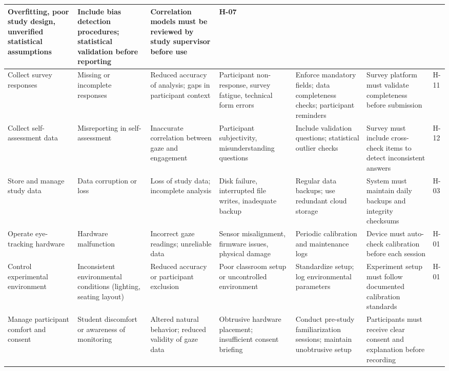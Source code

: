 \documentclass{article}
\begin{document}
\begin{table}[htbp]
{\begin{tabularx}{\textwidth}{|Y|Y|Y|Y|Y|Y|>{\centering\arraybackslash}p{1.2cm}|}
      Overfitting, poor study design, unverified statistical assumptions &
      Include bias detection procedures; statistical validation before reporting &
      Correlation models must be reviewed by study supervisor before use &
      H-07 \\
      \hline
      Collect survey responses & Missing or incomplete responses &
      Reduced accuracy of analysis; gaps in participant context &
      Participant non-response, survey fatigue, technical form errors &
      Enforce mandatory fields; data completeness checks; participant reminders &
      Survey platform must validate completeness before submission &
      H-11 \\
      \hline
      Collect self-assessment data & Misreporting in self-assessment &
      Inaccurate correlation between gaze and engagement &
      Participant subjectivity, misunderstanding questions &
      Include validation questions; statistical outlier checks &
      Survey must include cross-check items to detect inconsistent answers &
      H-12 \\
      \hline
      Store and manage study data & Data corruption or loss &
      Loss of study data; incomplete analysis &
      Disk failure, interrupted file writes, inadequate backup &
      Regular data backups; use redundant cloud storage &
      System must maintain daily backups and integrity checksums &
      H-03 \\
      \hline
      Operate eye-tracking hardware & Hardware malfunction & 
      Incorrect gaze readings; unreliable data &
      Sensor misalignment, firmware issues, physical damage &
      Periodic calibration and maintenance logs &
      Device must auto-check calibration before each session &
      H-01 \\
      \hline
      Control experimental environment & Inconsistent environmental conditions (lighting, seating layout) &
      Reduced accuracy or participant exclusion &
      Poor classroom setup or uncontrolled environment &
      Standardize setup; log environmental parameters &
      Experiment setup must follow documented calibration standards &
      H-01 \\
      \hline
      Manage participant comfort and consent & Student discomfort or awareness of monitoring &
      Altered natural behavior; reduced validity of gaze data &
      Obtrusive hardware placement; insufficient consent briefing &
      Conduct pre-study familiarization sessions; maintain unobtrusive setup &
      Participants must receive clear consent and explanation before recording &

\end{tabularx}}
\end{table}
\end{document}
